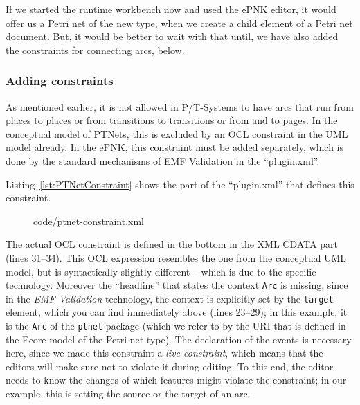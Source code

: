 If we started the runtime workbench now  and used the ePNK editor, it would
offer us a Petri net of the new type, when we create a child element of
a Petri net document. But, it would be better to wait with that until,
we have also added the constraints for connecting arcs, below.

\subsubsection{Adding constraints}
\label{subsubsec:simplePNTDconstraints}

As mentioned earlier, it is not allowed in P/T-Systems to have arcs that run
from places to places or from transitions to transitions or from and to pages.
In the conceptual model of PTNets, this is excluded by an OCL constraint in the
UML model already. In the ePNK, this constraint must be added separately, which is done
by the standard mechanisms of EMF Validation in the ``plugin.xml''.

Listing~\ref{lst:PTNetConstraint} shows the part of the ``plugin.xml'' that 
defines this constraint.
%
\begin{figure}[htbp!]
%
  {code/ptnet-constraint.xml}
\end{figure}
%
The actual OCL constraint is defined in the bottom in the XML CDATA part (lines
31--34). This OCL expression resembles the one from the conceptual UML model,
but is syntactically slightly different -- which is due to the specific technology.
Moreover the ``headline'' that states the context {\tt Arc} is missing, since
in the \emph{EMF Validation}%
technology, the context is explicitly set by the {\tt target} element, which you
can find immediately above (lines 23--29); in this example, it is the {\tt Arc}
of the {\tt ptnet} package (which we refer to by the URI that is defined in the
Ecore model of the Petri net type). The declaration of the events is necessary
here, since we made this constraint a \emph{live constraint},%
which means that the editors will make sure not to violate it during editing. To
this end, the editor needs to know the changes of which features might violate
the constraint; in our example, this is setting the source or the target of an arc.

